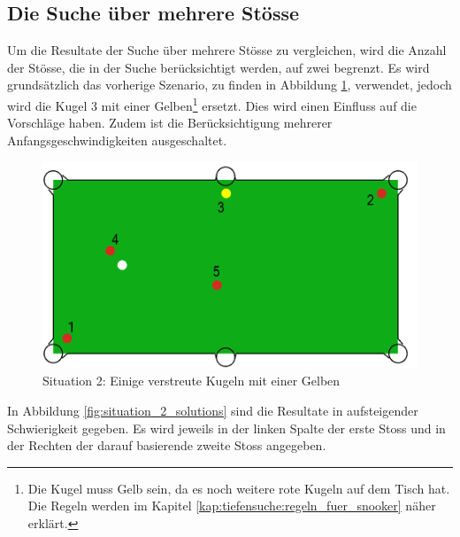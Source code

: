 \clearpage
\subsection{Die Suche über mehrere Stösse}
Um die Resultate der Suche über mehrere Stösse zu vergleichen, wird die Anzahl der Stösse, die in der Suche
berücksichtigt werden, auf zwei begrenzt. Es wird grundsätzlich das vorherige Szenario, zu finden in Abbildung
\ref{fig:search_situation_2}, verwendet, jedoch wird die
Kugel 3 mit einer Gelben\footnote{Die Kugel muss Gelb sein, da es noch weitere rote Kugeln auf dem Tisch hat. Die
Regeln werden im Kapitel \ref{kap:tiefensuche:regeln_fuer_snooker} näher erklärt.} ersetzt. Dies wird
einen Einfluss auf die Vorschläge haben. Zudem ist die Berücksichtigung mehrerer Anfangsgeschwindigkeiten ausgeschaltet.

%
%
\begin{figure}[h!]
    \begin{center}
        \includegraphics[width=0.4\linewidth]{../common/04_results/resources/simple_search/situation_diverse_deep_search.PNG}
    \end{center}
    \caption{Situation 2: Einige verstreute Kugeln mit einer Gelben}
    \label{fig:search_situation_2}
\end{figure}

In Abbildung \ref{fig:situation_2_solutions} sind die Resultate in aufsteigender Schwierigkeit gegeben. Es wird
jeweils in der linken Spalte der erste Stoss und in der Rechten der darauf basierende zweite Stoss angegeben.

